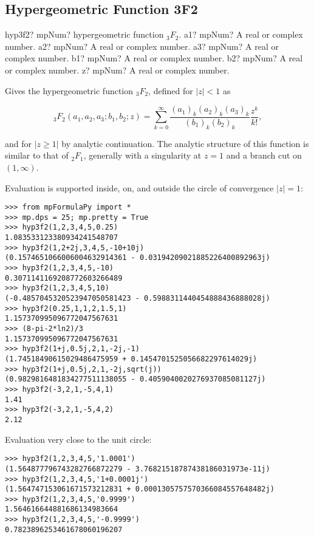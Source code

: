 \subsection{Hypergeometric Function 3F2}

\begin{mpFunctionsExtract}
	\mpFunctionSix
	{hyp3f2? mpNum? hypergeometric function ${}_3F_2$.}
	{a1? mpNum? A real or complex number.}
	{a2? mpNum? A real or complex number.}
	{a3? mpNum? A real or complex number.}	
	{b1? mpNum? A real or complex number.}
	{b2? mpNum? A real or complex number.}	
	{z? mpNum? A real or complex number.}
\end{mpFunctionsExtract}

\vpara
Gives the hypergeometric function ${}_3F_2$, defined for $|z|<1$ as

\begin{equation}
{}_3F_2(a_1,a_2,a_3;b_1,b_2;z) = \sum_{k=0}^{\infty} \frac{(a_1)_k (a_2)_k (a_3)_k}{(b_1)_k (b_2)_k} \frac{z^k}{k!},
\end{equation}

and for $|z \geq 1|$ by analytic continuation. The analytic structure of this function is similar to that of ${}_2F_1$, generally with a singularity at $z=1$ and a branch cut on $(1, \infty)$.

\vpara
Evaluation is supported inside, on, and outside the circle of convergence $|z|=1$:

\begin{lstlisting}
>>> from mpFormulaPy import *
>>> mp.dps = 25; mp.pretty = True
>>> hyp3f2(1,2,3,4,5,0.25)
1.083533123380934241548707
>>> hyp3f2(1,2+2j,3,4,5,-10+10j)
(0.1574651066006004632914361 - 0.03194209021885226400892963j)
>>> hyp3f2(1,2,3,4,5,-10)
0.3071141169208772603266489
>>> hyp3f2(1,2,3,4,5,10)
(-0.4857045320523947050581423 - 0.5988311440454888436888028j)
>>> hyp3f2(0.25,1,1,2,1.5,1)
1.157370995096772047567631
>>> (8-pi-2*ln2)/3
1.157370995096772047567631
>>> hyp3f2(1+j,0.5j,2,1,-2j,-1)
(1.74518490615029486475959 + 0.1454701525056682297614029j)
>>> hyp3f2(1+j,0.5j,2,1,-2j,sqrt(j))
(0.9829816481834277511138055 - 0.4059040020276937085081127j)
>>> hyp3f2(-3,2,1,-5,4,1)
1.41
>>> hyp3f2(-3,2,1,-5,4,2)
2.12
\end{lstlisting}


Evaluation very close to the unit circle:

\begin{lstlisting}
>>> hyp3f2(1,2,3,4,5,'1.0001')
(1.564877796743282766872279 - 3.76821518787438186031973e-11j)
>>> hyp3f2(1,2,3,4,5,'1+0.0001j')
(1.564747153061671573212831 + 0.0001305757570366084557648482j)
>>> hyp3f2(1,2,3,4,5,'0.9999')
1.564616644881686134983664
>>> hyp3f2(1,2,3,4,5,'-0.9999')
0.7823896253461678060196207
\end{lstlisting}



